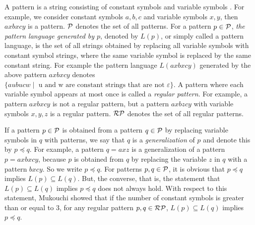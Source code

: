 
A pattern is a string consisting of constant symbols and variable symbols \cite{Angluin1980a,Angluin1980b}.
For example, we consider constant symbols $a,b,c$ and variable symbols $x,y$,  then $axbxcy$ is a pattern.
$\mathcal{P}$ denotes the set of all patterns.
For a pattern $p\in \mathcal{P}$, {\it the pattern language generated by $p$}, denoted by $L(p)$, or simply called a pattern language, is the set of all strings obtained by replacing all variable symbols with constant symbol strings, where the same variable symbol is replaced by the same constant string.
For example the pattern language $L(axbxcy)$ generated by the above pattern $axbxcy$ denotes $\{ aubucw \mid \mbox{  u and w are constant strings that are not $\varepsilon$} \}$.
A pattern where each variable symbol appears at most once is called a {\it regular pattern}. 
For example, a pattern $axbxcy$ is not a regular pattern, but a pattern $axbzcy$ with variable symbols $x,y,z$ is a regular pattern.
$\mathcal{RP}$ denotes the set of all regular patterns.

If a pattern $p\in \mathcal{P}$ is obtained from a pattern $q\in\mathcal{P}$ by replacing variable symbols in $q$ with patterns, we say that $q$ is a {\it generalization} of $p$ and denote this by $p\preceq q$.
For example, a pattern $q=axz$ is a generalization of a pattern $p=axbxcy$, because $p$ is obtained from $q$ by replacing the variable $z$ in $q$ with a pattern $bxcy$.
So we write $p\preceq q$.
For patterns $p,q\in \mathcal{P}$, it is obvious that $p\preceq q$ implies $L(p)\subseteq L(q)$.
But, the converse, that is, the statement that  $L(p)\subseteq L(q)$ implies $p\preceq q$ does not always hold.
With respect to this statement, Mukouchi \cite{Mukouchi1991} showed that if the number of constant symbols is greater than or equal to 3, for any regular pattern $p,q\in \mathcal{RP}$, $L(p)\subseteq L(q)$ implies $p\preceq q$.

